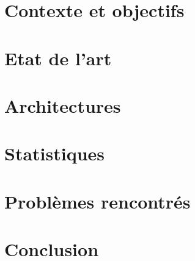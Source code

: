 \documentclass[14pt,a4paper,titlepage]{report}
\begin{document}

\renewcommand\headrulewidth{2pt}

\newpage
\pagestyle{empty}
\tableofcontents

\newpage
\chapter{Contexte et objectifs}
\thispagestyle{fancy}



\chapter{Etat de l'art}
\thispagestyle{fancy}
%


\chapter{Architectures}
\thispagestyle{fancy}
%


\chapter{Statistiques}
\thispagestyle{fancy}
%


\chapter{Problèmes rencontrés }
\thispagestyle{fancy}
%

\chapter{Conclusion}
\thispagestyle{fancy}
%
\end{document}
